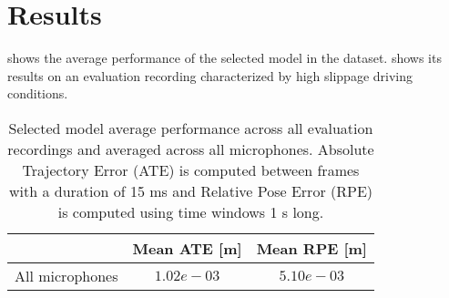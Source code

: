 \section{Results} \label{sec:results}

 shows the average performance of the
selected model in the  dataset.
 shows its results on an evaluation recording characterized
by high slippage driving conditions.

\begin{table}
    \centering
    \begin{tabular}{|c|c|c|}
        \hline
                        & Mean ATE [m] & Mean RPE [m] \\ \hline
        All microphones & $1.02e-03$   & $5.10e-03$     \\
        \hline
    \end{tabular}
    \caption[Selected model average performance across evaluation recordings
        and microphones]{Selected model average performance across all
        evaluation recordings and averaged across all microphones. Absolute
        Trajectory Error (ATE) is computed between frames with a duration of
        15 ms and Relative Pose Error (RPE) \cite{Measuring2019} is computed
        using time windows 1 s long.}
    \label{table:results-selected-model}
\end{table}


\begin{figure*}
    \centering
\end{figure*}


